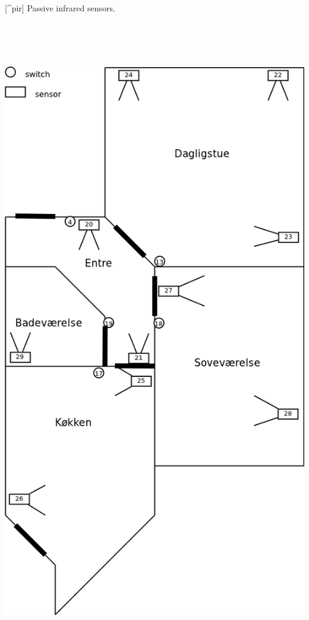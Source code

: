 [\^{}pir] Passive infrared sensors.
\includegraphics[width=602pt,height=1102pt]{figures/hellebaekgade3.png}



